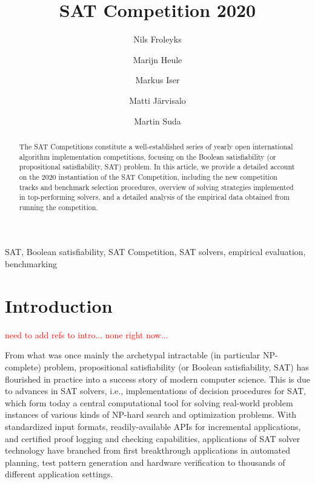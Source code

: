 \documentclass{elsarticle}
\title{SAT Competition 2020\tnoteref{title}}
\author[jku]{Nils Froleyks}
\author[cmu]{Marijn Heule}
\author[kit]{Markus Iser}
\author[uh]{Matti J\"arvisalo}
\author[ctu]{Martin Suda}
\begin{document}
\begin{abstract}
The SAT Competitions constitute a well-established series of yearly open international algorithm implementation competitions,
focusing on the Boolean satisfiability (or propositional satisfiability, SAT) problem. 
In this article, we provide
a detailed account on the 2020 instantiation of the SAT Competition, including the 
 new competition tracks and benchmark selection procedures, overview of solving strategies implemented in top-performing solvers, 
and a detailed analysis of the empirical data obtained from running the competition.
\end{abstract}

\begin{keyword}
SAT, Boolean satisfiability, SAT Competition, SAT solvers, empirical evaluation,
benchmarking
\end{keyword}

\maketitle



\section{Introduction}

\textcolor{red}{need to add refs to intro... none right now...}

From what was once mainly the archetypal intractable (in particular NP-complete) problem, propositional satisfiability 
(or Boolean satisfiability, SAT) has flourished in practice into a success story of modern computer science.
This is due to advances in SAT solvers, i.e., implementations of decision procedures for SAT, which form today a 
central computational tool for solving real-world problem instances of various kinds of NP-hard search and optimization problems.
With standardized input formats, readily-available APIs for incremental applications,
and certified proof logging and checking capabilities, applications of SAT solver technology
have branched from first breakthrough applications in automated planning, test pattern generation and hardware verification
to thousands of different application settings. 
\end{document}
